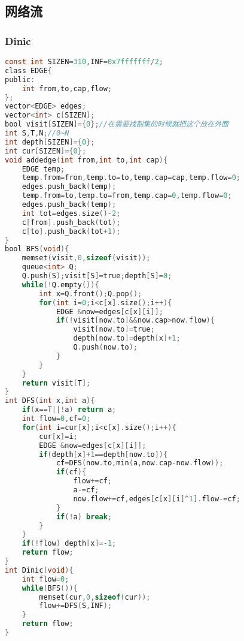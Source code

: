 \subsection{网络流}
\subsubsection{Dinic}
\begin{lstlisting}[language=C] 
const int SIZEN=310,INF=0x7fffffff/2;
class EDGE{
public:
	int from,to,cap,flow;
};
vector<EDGE> edges;
vector<int> c[SIZEN];
bool visit[SIZEN]={0};//在需要找割集的时候就把这个放在外面
int S,T,N;//0~N
int depth[SIZEN]={0};
int cur[SIZEN]={0};
void addedge(int from,int to,int cap){
	EDGE temp;
	temp.from=from,temp.to=to,temp.cap=cap,temp.flow=0;
	edges.push_back(temp);
	temp.from=to,temp.to=from,temp.cap=0,temp.flow=0;
	edges.push_back(temp);
	int tot=edges.size()-2;
	c[from].push_back(tot);
	c[to].push_back(tot+1);
}
bool BFS(void){
	memset(visit,0,sizeof(visit));
	queue<int> Q;
	Q.push(S);visit[S]=true;depth[S]=0;
	while(!Q.empty()){
		int x=Q.front();Q.pop();
		for(int i=0;i<c[x].size();i++){
			EDGE &now=edges[c[x][i]];
			if(!visit[now.to]&&now.cap>now.flow){
				visit[now.to]=true;
				depth[now.to]=depth[x]+1;
				Q.push(now.to);
			}
		}
	}
	return visit[T];
}
int DFS(int x,int a){
	if(x==T||!a) return a;
	int flow=0,cf=0;
	for(int i=cur[x];i<c[x].size();i++){
		cur[x]=i;
		EDGE &now=edges[c[x][i]];
		if(depth[x]+1==depth[now.to]){
			cf=DFS(now.to,min(a,now.cap-now.flow));
			if(cf){
				flow+=cf;
				a-=cf;
				now.flow+=cf,edges[c[x][i]^1].flow-=cf;
			}
			if(!a) break;
		}
	}
	if(!flow) depth[x]=-1;
	return flow;
}
int Dinic(void){
	int flow=0;
	while(BFS()){
		memset(cur,0,sizeof(cur));
		flow+=DFS(S,INF);
	}
	return flow;
}
\end{lstlisting}
